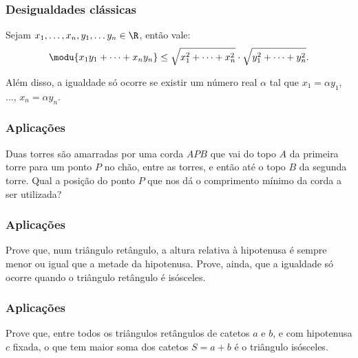     \begin{frame}
    \frametitle{Desigualdades clássicas} 
    
    
    \begin{teorema}
    Sejam $x_1, \dots , x_n, y_1, \dots y_n \in \R$, então vale:
    \begin{equation*}
            \modu{x_1y_1 + \dots + x_ny_n} \leq \sqrt{x^2_1+ \dots + x^2_n}
            \cdot \sqrt{y^2_1+ \dots + y^2_n}.
    \end{equation*}
    
    Além disso, a igualdade só ocorre se existir um número real $\alpha$
    tal que $x_1 = \alpha y_1$, ..., $x_n = \alpha y_n$.
    \end{teorema}
    
    \end{frame}
    \begin{frame}
    \frametitle{Aplicações} 
    \begin{exemplo}
    Duas torres são amarradas por uma corda $APB$ que vai do topo $A$ da
    primeira torre para um ponto $P$ no chão, entre as torres, e então
    até o topo $B$ da segunda torre. Qual a posição do ponto $P$ que nos
    dá o comprimento mínimo da corda a ser utilizada?
    \end{exemplo}
    \end{frame}
    \begin{frame}
    \frametitle{Aplicações} 
    \begin{exemplo}
    Prove que, num triângulo retângulo, a altura relativa à hipotenusa é
    sempre menor ou igual que a metade da hipotenusa. Prove, ainda, que
    a igualdade só ocorre quando o triângulo retângulo é isósceles.
    \end{exemplo}
    \end{frame}
    \begin{frame}
    \frametitle{Aplicações} 
    \begin{exemplo}
    Prove que, entre todos os triângulos retângulos de catetos $a$ e
    $b$, e com hipotenusa $c$ fixada, o que tem maior soma dos catetos
    $S = a+b$ é o triângulo isósceles.
    \end{exemplo}
    
    \end{frame}
    
